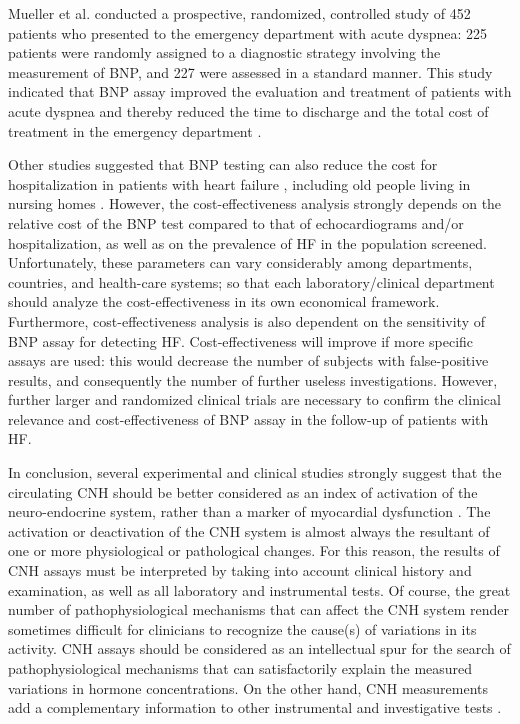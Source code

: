 \documentclass[14pt,a4paper,onecolumn]{extarticle}
\begin{document}
Mueller et al. conducted a prospective, randomized, controlled study of 452 patients who presented to the emergency department with acute dyspnea: 225 patients were randomly assigned to a diagnostic strategy involving the measurement of BNP, and 227 were assessed in a standard manner. This study indicated that BNP assay improved the evaluation and treatment of patients with acute dyspnea and thereby reduced the time to discharge and the total cost of treatment in the emergency department \citep{bib3265}.

Other studies suggested that BNP testing can also reduce the cost for hospitalization in patients with heart failure \citep{bib3263} \citep{bib3264}, including old people living in nursing homes \citep{bib3147}.  However, the cost-effectiveness analysis strongly depends on the relative cost of the BNP test compared to that of echocardiograms and/or hospitalization, as well as on the prevalence of HF in the population screened. Unfortunately, these parameters can vary considerably among departments, countries, and health-care systems; so that each laboratory/clinical department should analyze the cost-effectiveness in its own economical framework. Furthermore, cost-effectiveness analysis is also dependent on the sensitivity of BNP assay for detecting HF. Cost-effectiveness will improve if more specific assays are used: this would decrease the number of subjects with false-positive results, and consequently the number of further useless investigations. However, further larger and randomized clinical trials are necessary to confirm the clinical relevance and cost-effectiveness of BNP assay in the follow-up of patients with HF.


In conclusion, several  experimental and clinical studies strongly suggest that the circulating CNH should be better considered as an index of activation of the neuro-endocrine system, rather than a marker of myocardial dysfunction \citep{bib3298}. The activation or deactivation of the CNH system is almost always the resultant of one or more physiological or pathological changes. For this reason, the results of CNH assays must be interpreted by taking into account clinical history and examination, as well as all laboratory and instrumental tests. Of course, the great number of pathophysiological mechanisms that can affect the CNH system render sometimes difficult for clinicians to recognize the cause(s) of variations in its activity. CNH assays should be considered as an intellectual spur for the search of pathophysiological mechanisms that can satisfactorily explain the measured variations in hormone concentrations. On the other hand, CNH measurements add a complementary information to other instrumental and investigative tests \citep{bib3296}.
\end{document}
